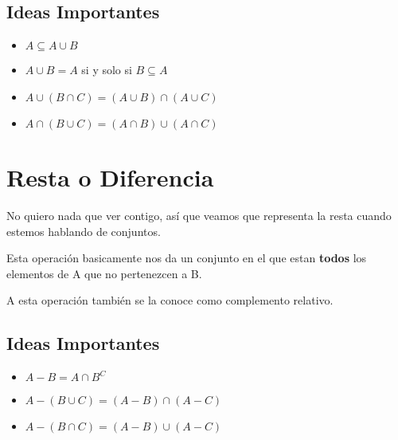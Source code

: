 \documentclass[12pt, fleqn]{report}                             %
\theoremstyle{break}                                            %
\begin{document}
            \subsection{Ideas Importantes}

                \begin{itemize}
                    \item $A \subseteq A \cup B$

                    \item $A \cup B = A$ si y solo si $B \subseteq A$

                    \item $A \cup (B \cap C) = (A \cup B) \cap (A \cup C)$

                    \item $A \cap (B \cup C) = (A \cap B) \cup (A \cap C)$
                \end{itemize}




        \clearpage
        \section{Resta o Diferencia}

            No quiero nada que ver contigo, así que veamos que representa la resta cuando estemos
            hablando de conjuntos.
            \begin{equation*}
            \end{equation*}

            Esta operación basicamente nos da un conjunto en el que estan \textbf{todos} los elementos
            de A que no pertenezcen a B.

            A esta operación también se la conoce como complemento relativo.

            \subsection{Ideas Importantes}

                \begin{itemize}
                    \item $A - B = A \cap B^C$

                    \item $A - (B \cup C) = (A - B) \cap (A - C)$

                    \item $A - (B \cap C) = (A - B) \cup (A - C)$

                \end{itemize}
\end{document}
